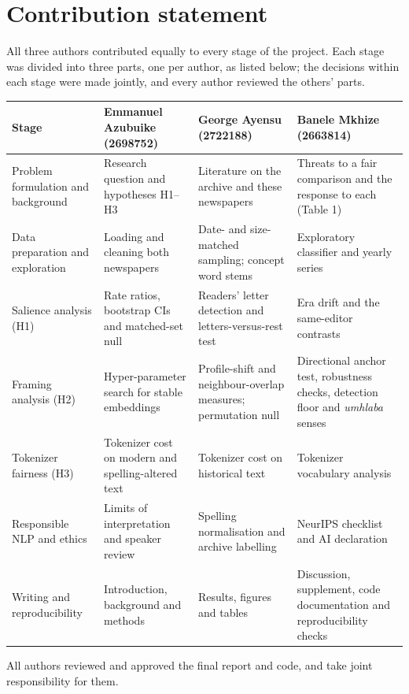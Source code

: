 \documentclass[10pt,letterpaper]{article}
\begin{document}
\onecolumn
\small
\section*{Contribution statement}

\noindent All three authors contributed equally to every stage of the project. Each stage was divided into three parts, one per author, as listed below; the decisions within each stage were made jointly, and every author reviewed the others' parts.

\medskip
\renewcommand{\arraystretch}{1.25}
\begin{tabular}{@{}L{1.25in}L{1.75in}L{1.75in}L{1.75in}@{}}
\toprule
\textbf{Stage} & \textbf{Emmanuel Azubuike} (2698752) & \textbf{George Ayensu} (2722188) & \textbf{Banele Mkhize} (2663814) \\ \midrule
Problem formulation and background & Research question and hypotheses H1--H3 & Literature on the archive and these newspapers & Threats to a fair comparison and the response to each (Table 1) \\ \addlinespace[4pt]
Data preparation and exploration & Loading and cleaning both newspapers & Date- and size-matched sampling; concept word stems & Exploratory classifier and yearly series \\ \addlinespace[4pt]
Salience analysis (H1) & Rate ratios, bootstrap CIs and matched-set null & Readers' letter detection and letters-versus-rest test & Era drift and the same-editor contrasts \\ \addlinespace[4pt]
Framing analysis (H2) & Hyper-parameter search for stable embeddings & Profile-shift and neighbour-overlap measures; permutation null & Directional anchor test, robustness checks, detection floor and \emph{umhlaba} senses \\ \addlinespace[4pt]
Tokenizer fairness (H3) & Tokenizer cost on modern and spelling-altered text & Tokenizer cost on historical text & Tokenizer vocabulary analysis \\ \addlinespace[4pt]
Responsible NLP and ethics & Limits of interpretation and speaker review & Spelling normalisation and archive labelling & NeurIPS checklist and AI declaration \\ \addlinespace[4pt]
Writing and reproducibility & Introduction, background and methods & Results, figures and tables & Discussion, supplement, code documentation and reproducibility checks \\
\bottomrule
\end{tabular}

\medskip
\noindent All authors reviewed and approved the final report and code, and take joint responsibility for them.
\end{document}
